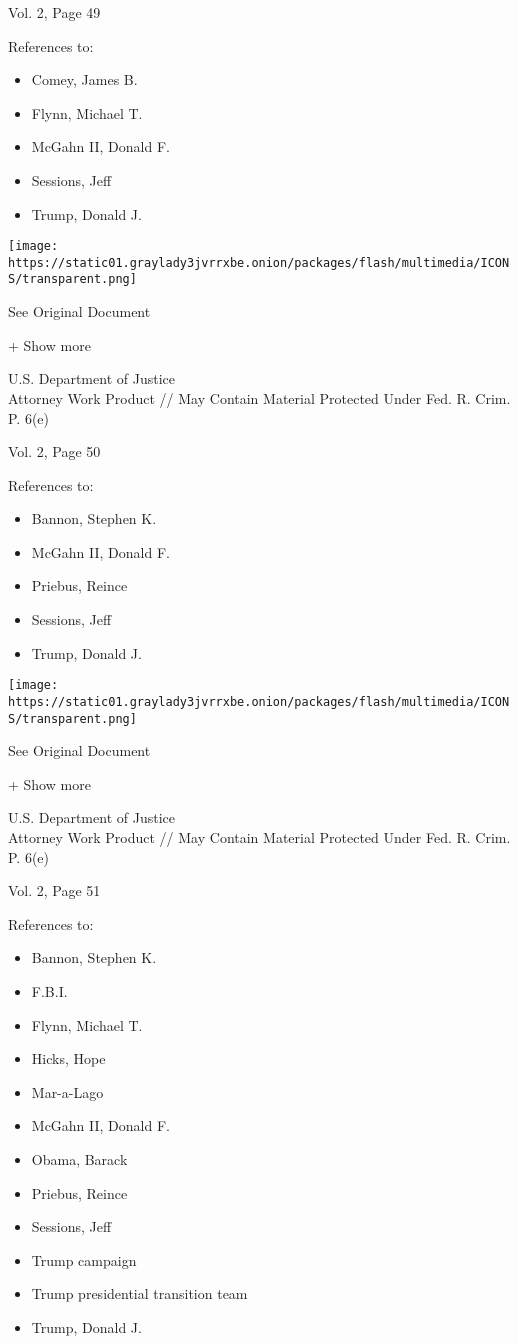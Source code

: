 Vol. 2, Page 49

References to:

\begin{itemize}
\tightlist
\item
  Comey, James B.
\item
  Flynn, Michael T.
\item
  McGahn II, Donald F.
\item
  Sessions, Jeff
\item
  Trump, Donald J.
\end{itemize}

\protect\hyperlink{}{}

\texttt{[image: https://static01.graylady3jvrrxbe.onion/packages/flash/multimedia/ICONS/transparent.png]}

See Original Document

+ Show more

U.S. Department of Justice\\
Attorney Work Product // May Contain Material Protected Under Fed. R.
Crim. P. 6(e)

Vol. 2, Page 50

References to:

\begin{itemize}
\tightlist
\item
  Bannon, Stephen K.
\item
  McGahn II, Donald F.
\item
  Priebus, Reince
\item
  Sessions, Jeff
\item
  Trump, Donald J.
\end{itemize}

\protect\hyperlink{}{}

\texttt{[image: https://static01.graylady3jvrrxbe.onion/packages/flash/multimedia/ICONS/transparent.png]}

See Original Document

+ Show more

U.S. Department of Justice\\
Attorney Work Product // May Contain Material Protected Under Fed. R.
Crim. P. 6(e)

Vol. 2, Page 51

References to:

\begin{itemize}
\tightlist
\item
  Bannon, Stephen K.
\item
  F.B.I.
\item
  Flynn, Michael T.
\item
  Hicks, Hope
\item
  Mar-a-Lago
\item
  McGahn II, Donald F.
\item
  Obama, Barack
\item
  Priebus, Reince
\item
  Sessions, Jeff
\item
  Trump campaign
\item
  Trump presidential transition team
\item
  Trump, Donald J.
\end{itemize}

